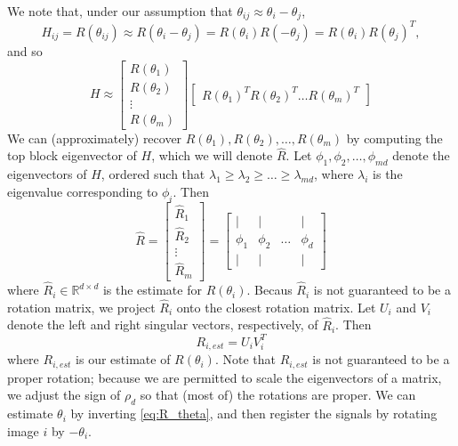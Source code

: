 \documentclass[11pt]{article}
\begin{document}
We note that, under our assumption that $\theta_{ij} \approx \theta_i - \theta_j$, 
\begin{equation} 
H_{ij} = R(\theta_{ij}) \approx R(\theta_i - \theta_j) = R(\theta_i) R(-\theta_j) = R(\theta_i) R(\theta_j)^T,
\end{equation}
 and so
\begin{equation} \label{eq:H_low_rank}
	H \approx 
	\begin{bmatrix}
	R(\theta_1) \\
	R(\theta_2) \\
	\vdots \\
	R(\theta_m)
	\end{bmatrix}
	\begin{bmatrix}
	R(\theta_1)^T R(\theta_2)^T \dots R(\theta_m)^T
	\end{bmatrix}
\end{equation}
%
We can (approximately) recover $R(\theta_1), R(\theta_2), \dots, R(\theta_m)$ by computing the top block eigenvector of $H$, which we will denote $\hat{R}$.
%
Let $\phi_1, \phi_2, \dots, \phi_{md}$ denote the eigenvectors of $H$, ordered such that $\lambda_1 \ge \lambda_2 \ge \dots \ge \lambda_{md}$, where $\lambda_i$ is the eigenvalue corresponding to $\phi_i$. 
%
Then
\begin{equation}
\hat{R} = 
\begin{bmatrix}
\hat{R}_1 \\
\hat{R}_2 \\
\vdots \\
\hat{R}_m
\end{bmatrix} =
\begin{bmatrix}
| & | & & | \\
\phi_1 & \phi_2 & \dots & \phi_d \\
| & | & & | 
\end{bmatrix}
\end{equation}
where $\hat{R}_i \in \mathbb{R}^{d \times d}$ is the estimate for $R(\theta_i)$. 
%
Becaus $\hat{R}_i$ is not guaranteed to be a rotation matrix, we project $\hat{R}_i$ onto the closest rotation matrix. 
%
Let $U_i$ and $V_i$ denote the left and right singular vectors, respectively, of $\hat{R}_i$.
%
Then
\begin{equation}
R_{i, est} = U_i V_i^T
\end{equation} 
where $R_{i, est}$ is our estimate of $R(\theta_i)$. 
%
Note that $R_{i, est}$ is not guaranteed to be a proper rotation; because we are permitted to scale the eigenvectors of a matrix, we adjust the sign of $\rho_d$ so that (most of) the rotations are proper. 
%
We can estimate $\theta_{i}$ by inverting \eqref{eq:R_theta}, and then register the signals by rotating image $i$ by $-\theta_i$. 
\end{document}
